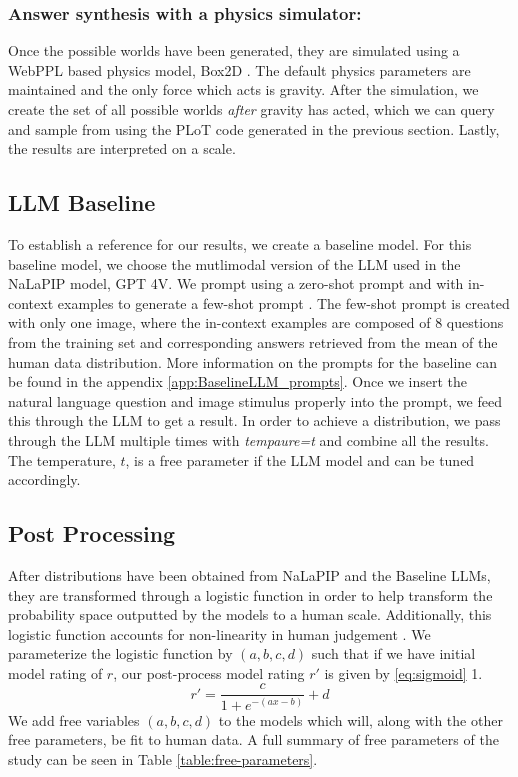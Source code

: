 \documentclass[10pt,letterpaper]{article}
\begin{document}
\subsubsection{Answer synthesis with a physics simulator:} Once the possible worlds have been generated, they are simulated using a WebPPL based physics model, Box2D \cite{box2d}. The default physics parameters are maintained and the only force which acts is gravity. After the simulation, we create the set of all possible worlds \textit{after} gravity has acted, which we can query and sample from using the PLoT code generated in the previous section. Lastly, the results are interpreted on a  scale. 

\subsection{LLM Baseline}

To establish a reference for our results, we create a baseline model. For this baseline model, we choose the mutlimodal version of the LLM used in the NaLaPIP model, GPT 4V. We prompt using a zero-shot prompt and with in-context examples to generate a few-shot prompt \cite{brown2020language}. The few-shot prompt is created with only one image, where the in-context examples are composed of 8 questions from the training set and corresponding answers retrieved from the mean of the human data distribution. More information on the prompts for the baseline can be found in the appendix \autoref{app:BaselineLLM_prompts}. Once we insert the natural language question and image stimulus properly into the prompt, we feed this through the LLM to get a result. In order to achieve a distribution, we pass through the LLM multiple times with \textit{tempaure=t} and combine all the results. The temperature, $t$, is a free parameter if the LLM model and can be tuned accordingly.

\subsection{Post Processing}

After distributions have been obtained from NaLaPIP and the Baseline LLMs, they are transformed through a logistic function in order to help transform the probability space outputted by the models to a human scale. Additionally, this logistic function accounts for non-linearity in human judgement \cite{KIM2008517}. 
We parameterize the logistic function by $(a,b,c,d)$ such that if we have initial model rating of $r$, our post-process model rating $r'$ is given by \autoref{eq:sigmoid} 1. 
\begin{equation}
    r' = \frac{c}{1 + e^{-(ax-b)}} + d
\end{equation}
\label{eq:sigmoid}
We add free variables $(a,b,c,d)$ to the models which will, along with the other free parameters, be fit to human data. A full summary of free parameters of the study can be seen in Table \ref{table:free-parameters}. 
\end{document}
